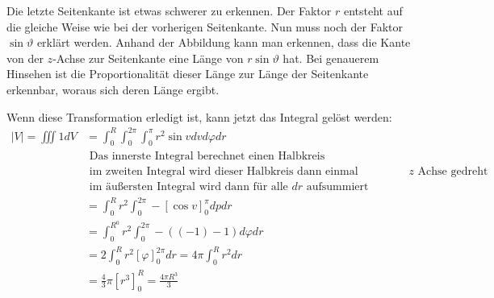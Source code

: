 \documentclass{report}
\begin{document}
{    Die letzte Seitenkante ist etwas schwerer zu erkennen. 
    Der Faktor $r$ entsteht auf die gleiche Weise wie bei der vorherigen Seitenkante. 
    Nun muss noch der Faktor $\sin\vartheta$ erklärt werden. Anhand der Abbildung kann man erkennen, dass die Kante von der $z$-Achse zur Seitenkante eine Länge von $r\sin\vartheta$ hat. 
    Bei genauerem Hinsehen ist die Proportionalität dieser Länge zur Länge der Seitenkante erkennbar, woraus sich deren Länge ergibt.\newline

    Wenn diese Transformation erledigt ist, kann jetzt das Integral gelöst werden:
    \begin{align*}
        |V|=\iiint 1 d V & =\int_0^R \int_0^{2 \pi} \int_0^\pi r^2 \sin v d v d \varphi d r \\
        &\text{ Das innerste Integral berechnet einen Halbkreis}\\
        &\text{ im zweiten Integral wird dieser Halbkreis dann einmal vollständig um die $z$ Achse gedreht}\\
        &\text{ im äußersten Integral wird dann für alle $dr$ aufsummiert}\\
        & =\int_0^R r^2 \int_0^{2 \pi}-[\cos v]_0^\pi d p d r \\
        & =\int_0^{R^0} r^2 \int_0^{2 \pi}-((-1)-1) d \varphi d r \\
        & =2 \int_0^R r^2[\varphi]_0^{2 \pi} d r=4 \pi \int_0^R r^2 d r \\
        & =\frac{4}{3} \pi\left[r^3\right]_0^R=\frac{4 \pi R^3}{3}
    \end{align*}
}
\end{document}
